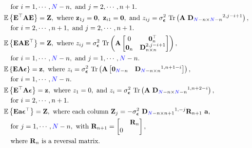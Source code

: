 \begin{lem}
\begin{equation*}
\begin{aligned}
& \quad \text{for} \ i = 1, \cdots, \color{blue}N\color{black}-n, \ \text{and} \ j = 2, \cdots, n+1. \\
& \mathbb{E} \left\{ \mathbf{E}^\top \mathbf{A} \mathbf{E} \right\} = \mathbf{Z}, \ 
\text{where} \ \mathbf{z}_{1j} = \mathbf{0}, \ \mathbf{z}_{i1} = \mathbf{0}, \ \text{and} \ 
z_{ij} = \sigma_{\bm{\epsilon}}^2 \ \mathrm{Tr} \left( \mathbf{A} \ \mathbf{D}_{\color{blue}N\color{black}-n \times \color{blue}N\color{black}-n}^{2, j-i+1} \right) , \\
& \quad \text{for} \ i = 2, \cdots, n+1, \ \text{and} \ j=2, \cdots, n+1 . \\ 
& \mathbb{E} \left\{ \mathbf{E} \mathbf{A} \mathbf{E}^\top \right\} = \mathbf{Z}, \
\text{where} \ z_{ij} = \sigma_{\bm{\epsilon}}^2 \ \mathrm{Tr} \left( \mathbf{A} \begin{bmatrix} 0 & \mathbf{0}_{n}^\top \\ \mathbf{0}_{n} & \mathbf{D}_{n \times n}^{2, j-i+1} \end{bmatrix} \right), \\
& \quad \text{for} \ i = 1,\cdots,\color{blue}N\color{black}-n, \ \text{and} \ j=1,\cdots,\color{blue}N\color{black}-n. \\ 
& \mathbb{E} \left\{ \mathbf{E} \mathbf{A} \bm{\epsilon} \right\} = \mathbf{z}, \
\text{where} \ z_i = \sigma_{\bm{\epsilon}}^2 \ \mathrm{Tr} \left( \mathbf{A} \begin{bmatrix} \mathbf{0}_{\color{blue}N\color{black}-n} & \mathbf{D}_{\color{blue}N\color{black}-n \times n}^{1,n+1-i} \end{bmatrix} \right) , \\
& \quad \text{for} \ i = 1,\cdots,\color{blue}N\color{black}-n . \\
& \mathbb{E} \left\{ \mathbf{E}^\top \mathbf{A} \bm{\epsilon} \right\} = \mathbf{z}, \
\text{where} \ z_1 = 0, \ \text{and} \ z_i = \sigma_{\bm{\epsilon}}^2 \ \mathrm{Tr} \left( \mathbf{A} \ \mathbf{D}_{\color{blue}N\color{black}-n \times \color{blue}N\color{black}-n}^{1, n+2-i} \right), \\
& \quad \text{for} \ i = 2,\cdots,n+1 . \\
& \mathbb{E} \left\{ \mathbf{E} \mathbf{a} \bm{\epsilon}^\top \right\} = \mathbf{Z}, \
\text{where each column} \ \mathbf{Z}_{j} = - \sigma_{\bm{\epsilon}}^2 \ \mathbf{D}_{\color{blue}N\color{black}-n \times n+1}^{1,-j} \mathbf{R}_{n+1} \ \mathbf{a} , \\
& \quad \text{for} \ j = 1,\cdots,\color{blue}N\color{black}-n , \ \text{with} \ \mathbf{R}_{n+1} = \begin{bmatrix} & \mathbf{R}_n \\ 0 \end{bmatrix} , \\ & \quad
\text{where} \ \mathbf{R}_n \ \text{is a reversal matrix.}
\end{aligned} \end{equation*} 
\end{lem}

